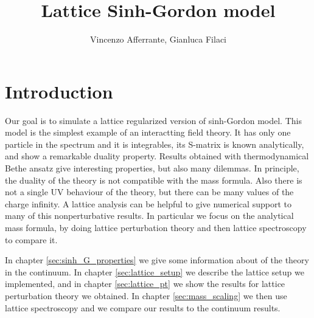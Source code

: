 \documentclass[12pt,a4paper]{report}
\begin{document}
 

 
\title{Lattice Sinh-Gordon model }
\author{Vincenzo Afferrante, Gianluca Filaci} 
 
\maketitle

\chapter{Introduction} 

Our goal is to simulate  a lattice regularized version of sinh-Gordon model. This model is the simplest example of an interactting field theory. It has only one particle in the spectrum and it is integrables, its S-matrix is known analytically, and show a remarkable duality property. Results obtained with thermodynamical Bethe ansatz give interesting properties, but also many dilemmas. In principle, the duality of the theory is not compatible with the mass formula. Also there is not a single UV behaviour of the theory, but there can be many values of the charge infinity. A lattice analysis can be helpful to give numerical support to many of this nonperturbative results. In particular we focus on the analytical mass formula, by doing lattice perturbation theory and then lattice spectroscopy to compare it.

In chapter \ref{sec:sinh_G_properties} we give some information about of the theory in the continuum. In chapter \ref{sec:lattice_setup} we describe the lattice setup we implemented, and in chapter \ref{sec:lattice_pt} we show the results for lattice perturbation theory we obtained. In chapter \ref{sec:mass_scaling} we then use lattice spectroscopy and we compare our results to the continuum results.
\end{document}
